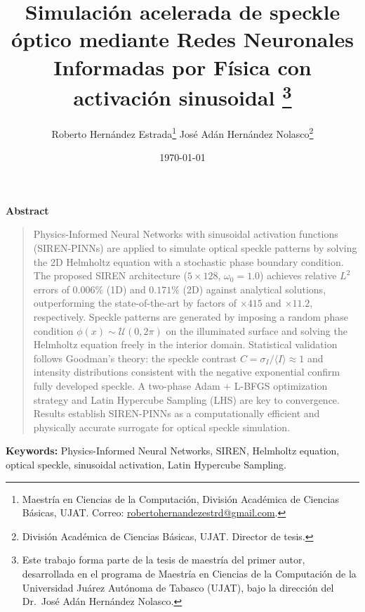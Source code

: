 \documentclass[12pt]{article}
\title{Simulación acelerada de speckle óptico mediante Redes
       Neuronales Informadas por Física con activación sinusoidal%
       \thanks{Este trabajo forma parte de la tesis de maestría del primer autor,
               desarrollada en el programa de Maestría en Ciencias de la Computación
               de la Universidad Juárez Autónoma de Tabasco (UJAT),
               bajo la dirección del Dr.\ José Adán Hernández Nolasco.}}
\author{%
  Roberto Hernández Estrada\thanks{Maestría en Ciencias de la Computación,
    División Académica de Ciencias Básicas, UJAT.
    Correo: \href{mailto:robertohernandezestrd@gmail.com}{robertohernandezestrd@gmail.com}.} \quad
  José Adán Hernández Nolasco\thanks{División Académica de Ciencias Básicas, UJAT.
    Director de tesis.}
}
\date{\today}
\begin{document}

\maketitle
\thispagestyle{empty}

\begin{center}
  \textbf{Abstract}
\end{center}
\begin{quote}
\noindent\singlespacing
Physics-Informed Neural Networks with sinusoidal activation functions (SIREN-PINNs)
are applied to simulate optical speckle patterns by solving the 2D Helmholtz equation
with a stochastic phase boundary condition.
The proposed SIREN architecture ($5 \times 128$, $\omega_0 = 1.0$) achieves relative
$L^2$ errors of $0.006\%$ (1D) and $0.171\%$ (2D) against analytical solutions,
outperforming the state-of-the-art by factors of $\times 415$ and $\times 11.2$,
respectively.
Speckle patterns are generated by imposing a random phase condition
$\phi(x) \sim \mathcal{U}(0, 2\pi)$ on the illuminated surface and solving the
Helmholtz equation freely in the interior domain.
Statistical validation follows Goodman's theory: the speckle contrast
$C = \sigma_I / \langle I \rangle \approx 1$ and intensity distributions consistent
with the negative exponential confirm fully developed speckle.
A two-phase Adam + L-BFGS optimization strategy and Latin Hypercube Sampling (LHS)
are key to convergence.
Results establish SIREN-PINNs as a computationally efficient and physically accurate
surrogate for optical speckle simulation.
\end{quote}

\vspace{0.8em}
\noindent \textbf{Keywords:} Physics-Informed Neural Networks, SIREN,
Helmholtz equation, optical speckle, sinusoidal activation, Latin Hypercube Sampling.

\vspace{1.2em}
\end{document}
